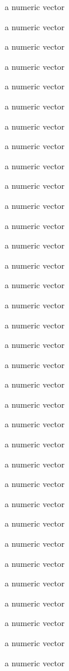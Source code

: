 \begin{Format}
\begin{description}
\item[] a numeric vector
\item[] a numeric vector
\item[] a numeric vector
\item[] a numeric vector
\item[] a numeric vector
\item[] a numeric vector
\item[] a numeric vector
\item[] a numeric vector
\item[] a numeric vector
\item[] a numeric vector
\item[] a numeric vector
\item[] a numeric vector
\item[] a numeric vector
\item[] a numeric vector
\item[] a numeric vector
\item[] a numeric vector
\item[] a numeric vector
\item[] a numeric vector
\item[] a numeric vector
\item[] a numeric vector
\item[] a numeric vector
\item[] a numeric vector
\item[] a numeric vector
\item[] a numeric vector
\item[] a numeric vector
\item[] a numeric vector
\item[] a numeric vector
\item[] a numeric vector
\item[] a numeric vector
\item[] a numeric vector
\item[] a numeric vector
\item[] a numeric vector
\item[] a numeric vector
\item[] a numeric vector

\end{description}
\end{Format}
